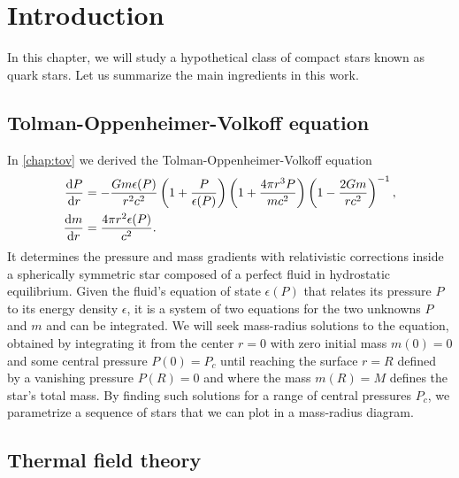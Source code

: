 \chapter{Introduction}



In this chapter, we will study a hypothetical class of compact stars known as quark stars.
Let us summarize the main ingredients in this work.

\section{Tolman-Oppenheimer-Volkoff equation}

In \cref{chap:tov} we derived the Tolman-Oppenheimer-Volkoff equation
\begin{subequations}
\begin{align}
	\odv{P}{r} &= -\frac{G m \epsilon(P)}{r^2 c^2} \left( 1 + \frac{P}{\epsilon(P)} \right) \left( 1 + \frac{4 \pi r^3 P}{m c^2} \right) \left( 1 - \frac{2 G m}{r c^2} \right)^{-1} , \\
	\odv{m}{r} &= \frac{4 \pi r^2 \epsilon(P)}{c^2} .
\end{align}
\end{subequations}
It determines the pressure and mass gradients with relativistic corrections inside a spherically symmetric star composed of a perfect fluid in hydrostatic equilibrium.
Given the fluid's equation of state $\epsilon(P)$ that relates its pressure $P$ to its energy density $\epsilon$, it is a system of two equations for the two unknowns $P$ and $m$ and can be integrated.
We will seek mass-radius solutions to the equation, obtained by integrating it from the center $r=0$ with zero initial mass $m(0) = 0$ and some central pressure $P(0) = P_c$ until reaching the surface $r=R$ defined by a vanishing pressure $P(R) = 0$ and where the mass $m(R) = M$ defines the star's total mass.
By finding such solutions for a range of central pressures $P_c$, we parametrize a sequence of stars that we can plot in a mass-radius diagram.

\section{Thermal field theory}

